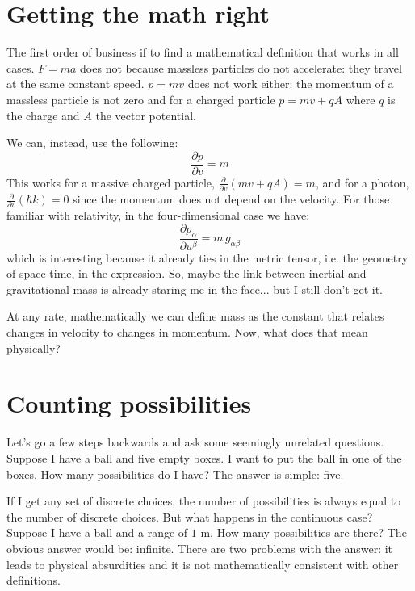 \documentclass[aps,pra,10pt,floatfix,nofootinbib]{revtex4-1}
\theoremstyle{definition}
\begin{document}
\section{Getting the math right}

The first order of business if to find a mathematical definition that works in all cases. $F=ma$ does not because massless particles do not accelerate: they travel at the same constant speed. $p=mv$ does not work either: the momentum of a massless particle is not zero and for a charged particle $p=mv + qA$ where $q$ is the charge and $A$ the vector potential.

We can, instead, use the following:
\begin{equation}
\label{simpleMass}
\frac{\partial p}{\partial v} = m
\end{equation}
This works for a massive charged particle, $\frac{\partial}{\partial v} (mv + qA) = m$, and for a photon, $\frac{\partial}{\partial v} (\hbar k) = 0$ since the momentum does not depend on the velocity. For those familiar with relativity, in the four-dimensional case we have:
\begin{equation}
\label{advancedMass}
\frac{\partial p_\alpha}{\partial u^\beta} = m \, g_{\alpha \beta}
\end{equation}
which is interesting because it already ties in the metric tensor, i.e. the geometry of space-time, in the expression. So, maybe the link between inertial and gravitational mass is already staring me in the face... but I still don't get it. 

At any rate, mathematically we can define mass as the constant that relates changes in velocity to changes in momentum. Now, what does that mean physically?

\section{Counting possibilities}

Let's go a few steps backwards and ask some seemingly unrelated questions. Suppose I have a ball and five empty boxes. I want to put the ball in one of the boxes. How many possibilities do I have? The answer is simple: five.

If I get any set of discrete choices, the number of possibilities is always equal to the number of discrete choices. But what happens in the continuous case? Suppose I have a ball and a range of $1$ m. How many possibilities are there? The obvious answer would be: infinite. There are two problems with the answer: it leads to physical absurdities and it is not mathematically consistent with other definitions.
\end{document}
